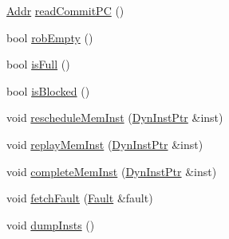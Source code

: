 \begin{DoxyCompactItemize}
\item 
\hyperlink{base_2types_8hh_af1bb03d6a4ee096394a6749f0a169232}{Addr} \hyperlink{classBackEnd_aa28f3fe58fde4b038a92b9f87a40cb10}{readCommitPC} ()
\item 
bool \hyperlink{classBackEnd_a5c38df1621043861ada4dd0939509869}{robEmpty} ()
\item 
bool \hyperlink{classBackEnd_a3e70330939fdfc4dbc2f60c1a660584d}{isFull} ()
\item 
bool \hyperlink{classBackEnd_ae6ec007d68382eb124ed25bc90ae9c17}{isBlocked} ()
\item 
void \hyperlink{classBackEnd_aa9c46f45f491ef90a936c7e2b95f20aa}{rescheduleMemInst} (\hyperlink{classBackEnd_a028ce10889c5f6450239d9e9a7347976}{DynInstPtr} \&inst)
\item 
void \hyperlink{classBackEnd_ae165df775b4de9e9430228c7f04c2bc9}{replayMemInst} (\hyperlink{classBackEnd_a028ce10889c5f6450239d9e9a7347976}{DynInstPtr} \&inst)
\item 
void \hyperlink{classBackEnd_a2212f511dc1886c073cf7ff1665f5c87}{completeMemInst} (\hyperlink{classBackEnd_a028ce10889c5f6450239d9e9a7347976}{DynInstPtr} \&inst)
\item 
void \hyperlink{classBackEnd_a71dcc69e5b01fa12b8ccd2dccdcc9917}{fetchFault} (\hyperlink{classRefCountingPtr}{Fault} \&fault)
\item 
void \hyperlink{classBackEnd_a80587b4fe043bbe1995536cb3b361588}{dumpInsts} ()
\end{DoxyCompactItemize}
